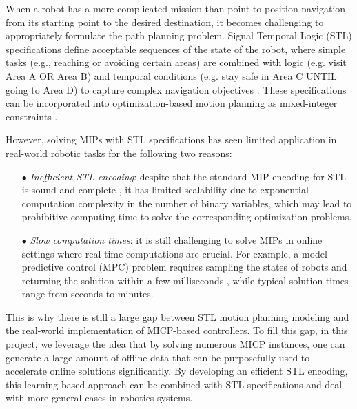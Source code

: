 \documentclass[a4paper]{report}
\begin{document}
When a robot has a more complicated mission than point-to-position navigation from its starting point to the desired destination, it becomes challenging to appropriately formulate the path planning problem. Signal Temporal Logic (STL) specifications define acceptable sequences of the state of the robot, where simple tasks (e.g., reaching or avoiding certain areas) are combined with logic (e.g. visit Area A OR Area B) and temporal conditions (e.g. stay safe in Area C UNTIL going to Area D) to capture complex navigation objectives \cite[]{ulusoy2013optimality}. These specifications can be incorporated into optimization-based motion planning as mixed-integer constraints \cite[]{raman2014model}. 

However, solving MIPs with STL specifications has seen limited application in real-world robotic tasks for the following two reasons:

\begin{itemize}
    \item[$\bullet$] \textit{Inefficient STL encoding}: despite that the standard MIP encoding for STL is sound and complete \cite[]{raman2014model}, it has limited scalability due to exponential computation complexity in the number of binary variables, which may lead to prohibitive computing time to solve the corresponding optimization problems.
\end{itemize}

\begin{itemize}
    \item[$\bullet$] \textit{Slow computation times}: it is still challenging to solve MIPs in online settings where real-time computations are crucial. For example, a model predictive control (MPC) problem requires sampling the states of robots and returning the solution within a few milliseconds \cite{ding2022trajectory}, while typical solution times range from seconds to minutes.
\end{itemize}

This is why there is still a large gap between STL motion planning modeling and the real-world implementation of MICP-based controllers. To fill this gap, in this project, we leverage the idea that by solving numerous MICP instances, one can generate a large amount of offline data that can be purposefully used to accelerate online solutions significantly. By developing an efficient STL encoding, this learning-based approach can be combined with STL specifications and deal with more general cases in robotics systems. 
\end{document}
